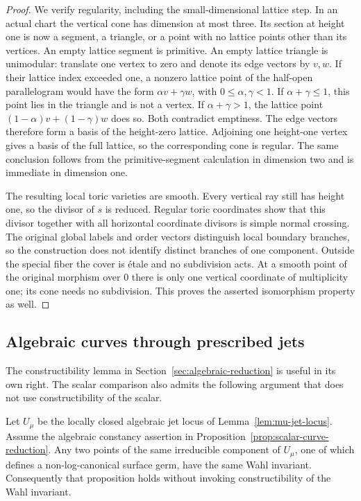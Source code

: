 \begin{proof}
We verify regularity, including the small-dimensional lattice step.
In an actual chart the vertical cone has dimension at most three.
Its section at height one is now a segment, a triangle, or a point
with no lattice points other than its vertices.  An empty lattice
segment is primitive.  An empty lattice triangle is unimodular:
translate one vertex to zero and denote its edge vectors by $v,w$.
If their lattice index exceeded one, a nonzero lattice point of the
half-open parallelogram would have the form
$\alpha v+\gamma w$, with $0\le\alpha,\gamma<1$.  If
$\alpha+\gamma\le1$, this point lies in the triangle and is not a
vertex.  If $\alpha+\gamma>1$, the lattice point
$(1-\alpha)v+(1-\gamma)w$ does so.  Both contradict emptiness.
The edge vectors therefore form a basis of the height-zero lattice.
Adjoining one height-one vertex gives a basis of the full lattice,
so the corresponding cone is regular.  The same conclusion follows
from the primitive-segment calculation in dimension two and is
immediate in dimension one.

The resulting local toric varieties are smooth.  Every vertical ray
still has height one, so the divisor of $s$ is reduced.  Regular
toric coordinates show that this divisor together with all horizontal
coordinate divisors is simple normal crossing.  The original global
labels and order vectors distinguish local boundary branches, so
the construction does not identify distinct branches of one component.
Outside the special fiber the cover is \'etale and no subdivision
acts.  At a smooth point of the original morphism over $0$ there is
only one vertical coordinate of multiplicity one; its cone needs no
subdivision.  This proves the asserted isomorphism property as well.
\end{proof}

\subsection{Algebraic curves through prescribed jets}

The constructibility lemma in Section~\ref{sec:algebraic-reduction}
is useful in its own right.  The scalar comparison also admits the
following argument that does not use constructibility of the scalar.

\begin{lemma}
\label{lem:jet-component-comparison}
Let $U_\mu$ be the locally closed algebraic jet locus of
Lemma~\ref{lem:mu-jet-locus}.  Assume the algebraic constancy assertion
in Proposition~\ref{prop:scalar-curve-reduction}.  Any two points of
the same irreducible component of $U_\mu$, one of which defines a
non-log-canonical surface germ, have the same Wahl invariant.
Consequently that proposition holds without invoking
constructibility of the Wahl invariant.
\end{lemma}

